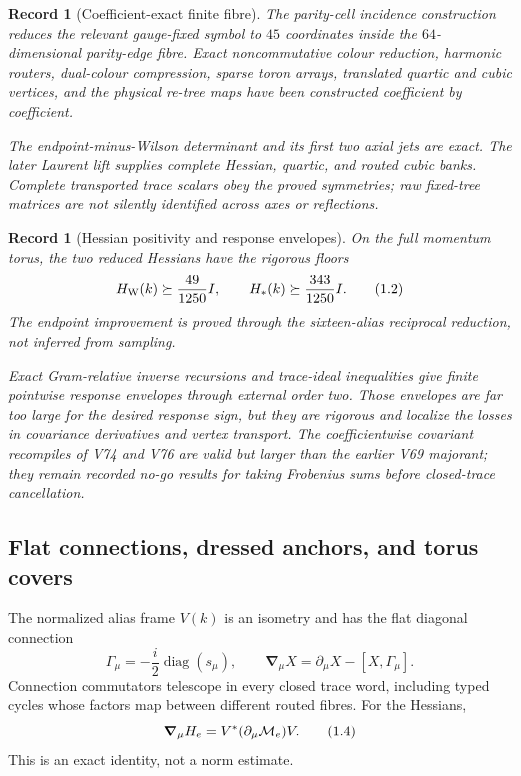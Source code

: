 \documentclass[11pt,oneside]{article}
\newtheorem{record}[theorem]{Record}
\theoremstyle{definition}
\theoremstyle{remark}
\begin{document}
\begin{record}[Coefficient-exact finite fibre]
\label{rec:newv1-fibre}
The parity-cell incidence construction reduces the relevant
gauge-fixed symbol to \(45\) coordinates inside the
\(64\)-dimensional parity-edge fibre.  Exact noncommutative colour
reduction, harmonic routers, dual-colour compression, sparse toron
arrays, translated quartic and cubic vertices, and the physical
re-tree maps have been constructed coefficient by coefficient.

The endpoint-minus-Wilson determinant and its first two axial jets
are exact.  The later Laurent lift supplies complete Hessian,
quartic, and routed cubic banks.  Complete transported trace scalars
obey the proved symmetries; raw fixed-tree matrices are not silently
identified across axes or reflections.
\end{record}

\begin{record}[Hessian positivity and response envelopes]
\label{rec:newv1-hessian}
On the full momentum torus, the two reduced Hessians have the
rigorous floors
\[
 H_{\rm W}(k)\succeq \frac{49}{1250}I,\qquad
 H_*(k)\succeq \frac{343}{1250}I.                          \tag{1.2}
\]
The endpoint improvement is proved through the sixteen-alias
reciprocal reduction, not inferred from sampling.

Exact Gram-relative inverse recursions and trace-ideal inequalities
give finite pointwise response envelopes through external order two.
Those envelopes are far too large for the desired response sign,
but they are rigorous and localize the losses in covariance
derivatives and vertex transport.  The coefficientwise covariant
recompiles of V74 and V76 are valid but larger than the earlier
V69 majorant; they remain recorded no-go results for taking
Frobenius sums before closed-trace cancellation.
\end{record}

\subsection{Flat connections, dressed anchors, and torus covers}

The normalized alias frame \(V(k)\) is an isometry and has the flat
diagonal connection
\[
 \Gamma_\mu=-\frac{i}{2}\operatorname{diag}(s_\mu),\qquad
 {\boldsymbol\nabla}_\mu X
 =\partial_\mu X-[X,\Gamma_\mu].                           \tag{1.3}
\]
Connection commutators telescope in every closed trace word,
including typed cycles whose factors map between different routed
fibres.  For the Hessians,
\[
 {\boldsymbol\nabla}_\mu H_e
 =V^*(\partial_\mu{\cal M}_e)V.                            \tag{1.4}
\]
This is an exact identity, not a norm estimate.
\end{document}
